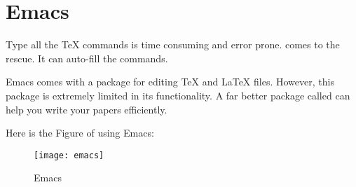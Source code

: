 
\chapter{Emacs}
\label{cha:emacs}

Type all the \TeX\xspace commands is time consuming and error prone.
 comes to the rescue. It can auto-fill the commands.

Emacs comes with a package for editing TeX and LaTeX files.
However, this package is extremely limited in its functionality.
A far better package called  can help you write your papers efficiently.

Here is the Figure of using Emacs:
\begin{figure}[H]
  \centering
  \texttt{[image: emacs]}
  \caption{Emacs}
  \label{fig:emacs}
\end{figure}


